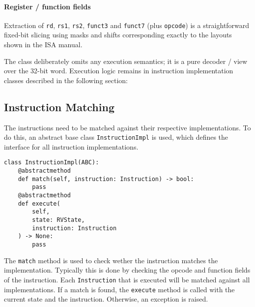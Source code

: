 \documentclass[sigconf]{acmart}
\begin{document}
\paragraph{Register / function fields} Extraction of \texttt{rd}, \texttt{rs1}, \texttt{rs2}, \texttt{funct3} and \texttt{funct7} (plus \texttt{opcode}) is a straightforward fixed-bit slicing using masks and shifts corresponding exactly to the layouts shown in the ISA manual. \cite{riscv-spec}

The class deliberately omits any execution semantics; it is a pure decoder / view over the 32-bit word. Execution logic remains in instruction implementation classes described in the following section:

\subsection{Instruction Matching}\label{sec:instruction-matching}
The instructions need to be matched against their respective implementations. To do this, an abstract base class \texttt{InstructionImpl} is used, which defines the interface for all instruction implementations.
\begin{verbatim}
class InstructionImpl(ABC):
    @abstractmethod
    def match(self, instruction: Instruction) -> bool:
        pass
    @abstractmethod
    def execute(
        self, 
        state: RVState, 
        instruction: Instruction
    ) -> None:
        pass
\end{verbatim}
The \texttt{match} method is used to check wether the instruction matches the implementation. Typically this is done by checking the opcode and function fields of the instruction.
Each \texttt{Instruction} that is executed will be matched against all implementations. 
If a match is found, the \texttt{execute} method is called with the current state and the instruction. Otherwise, an exception is raised.
\end{document}
